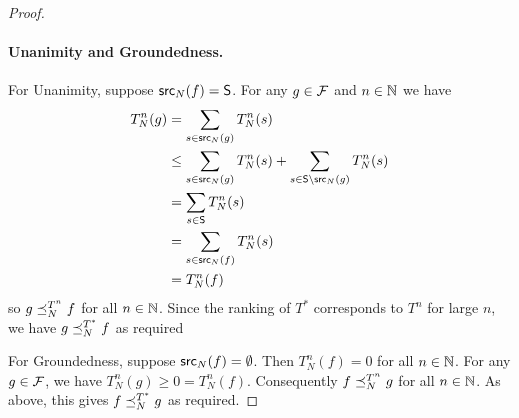\begin{proof}
\paragraph{Unanimity and Groundedness.}
For Unanimity, suppose $\mathsf{src}_N(f) = \mathsf{S}$. For any $g \in \mathcal{F}$ and $n \in \mathbb{N}$ we
have
\begin{align*}
    T_N^n(g)
    &= \sum_{s \in \mathsf{src}_N(g)}{T_N^n(s)} \\
    &\le \sum_{s \in \mathsf{src}_N(g)}{T_N^n(s)} + \sum_{s \in \mathsf{S} \setminus \mathsf{src}_N(g)}{T_N^n(s)} \\
    &= \sum_{s \in \mathsf{S}}{T_N^n(s)} \\
    &= \sum_{s \in \mathsf{src}_N(f)}{T_N^n(s)} \\
    &= T_N^n(f)
\end{align*}
so $g \preceq_N^{T^n} f$ for all $n \in \mathbb{N}$. Since the ranking of $T^*$
corresponds to $T^n$ for large $n$, we have $g \preceq_N^{T^*} f$ as
required

For Groundedness, suppose $\mathsf{src}_N(f) = \emptyset$. Then $T_N^n(f) = 0$ for all $n
\in \mathbb{N}$. For any $g \in \mathcal{F}$, we have $T_N^n(g) \ge 0 = T_N^n(f)$.
Consequently $f \preceq_N^{T^n} g$ for all $n \in \mathbb{N}$. As above, this gives $f
\preceq_N^{T^*} g$ as required.
\end{proof}

